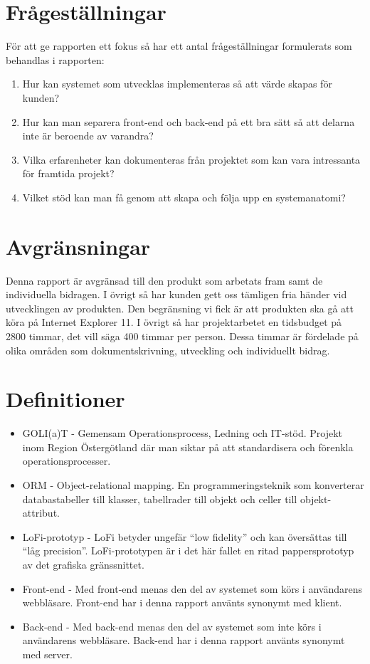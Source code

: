 \section{Frågeställningar}
För att ge rapporten ett fokus så har ett antal frågeställningar formulerats som behandlas i rapporten:
\begin{enumerate}
	\item Hur kan systemet som utvecklas implementeras så att värde skapas för kunden?
	\item Hur kan man separera front-end och back-end på ett bra sätt så att delarna inte är beroende av varandra?
	\item Vilka erfarenheter kan dokumenteras från projektet som kan vara intressanta för framtida projekt?
	\item Vilket stöd kan man få genom att skapa och följa upp en systemanatomi?
\end{enumerate}

\section{Avgränsningar}
Denna rapport är avgränsad till den produkt som arbetats fram samt de individuella bidragen. I övrigt så har kunden gett oss tämligen fria händer vid utvecklingen av produkten. Den begränsning vi fick är att produkten ska gå att köra på Internet Explorer 11.
I övrigt så har projektarbetet en tidsbudget på 2800 timmar, det vill säga 400 timmar per person. Dessa timmar är fördelade på olika områden som dokumentskrivning, utveckling och individuellt bidrag.

\section{Definitioner}

\begin{itemize}

\item GOLI(a)T - Gemensam Operationsprocess, Ledning och IT-stöd. Projekt inom Region Östergötland där man siktar på att standardisera och förenkla operationsprocesser.

\item ORM - Object-relational mapping. En programmeringsteknik som konverterar databastabeller till klasser, tabellrader till objekt och celler till objekt-attribut.

\item LoFi-prototyp - LoFi betyder ungefär ``low fidelity'' och kan översättas till ``låg precision''. LoFi-prototypen är i det här fallet en ritad pappersprototyp av det grafiska gränssnittet.

\item Front-end - Med front-end menas den del av systemet som körs i användarens webbläsare. Front-end har i denna rapport använts synonymt med klient.

\item Back-end - Med back-end menas den del av systemet som inte körs i användarens webbläsare. Back-end har i denna rapport använts synonymt med server. 

\end{itemize}

\newpage

